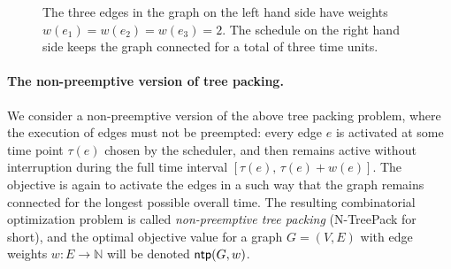 \documentclass[runningheads]{llncs}
\newcommand{\N}{\mathbb{N}}
\DeclareMathOperator{\ntp}{\text{\sf ntp}}
\newcommand{\xxxNTP}{{\sc N-TreePack}}
\begin{document}
\begin{figure}[tbh]
\bigskip
\begin{center}
\qquad\qquad\qquad

\end{center}
\caption{The three edges in the graph on the left hand side have weights $w(e_1)=w(e_2)=w(e_3)=2$.
The schedule on the right hand side keeps the graph connected for a total of three time units.}
\label{fig:example}
\end{figure}

\paragraph{The non-preemptive version of tree packing.}
We consider a non-preemptive version of the above tree packing problem,
where the execution of edges must not be preempted: 
every edge $e$ is activated at some time point $\tau(e)$ chosen by the scheduler, and then 
remains active without interruption during the full time interval $[\tau(e),\,\tau(e)+w(e)]$.
The objective is again to activate the edges in a such way that the graph
remains connected for the longest possible overall time.
The resulting combinatorial optimization problem is called \emph{non-preemptive tree packing}
({\xxxNTP} for short), and the optimal objective value for a graph $G=(V,E)$ with edge 
weights $w:E\to\N$ will be denoted $\ntp(G,w)$.
\end{document}
